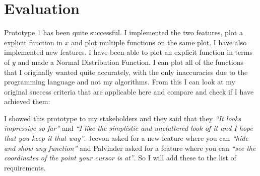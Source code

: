 \documentclass[../../../main.tex]{subfiles}
\begin{document}
\chapter{Evaluation}
Prototype 1 has been quite successful. I implemented the two features, plot a explicit function in $x$ and plot multiple functions on the same plot. I have also implemented new features. I have been able to plot an explicit function in terms of $y$ and made a Normal Distribution Function. I can plot all of the functions that I originally wanted quite accurately, with the only inaccuracies due to the programming language and not my algorithms. From this I can look at my original success criteria that are applicable here and compare and check if I have achieved them:
\begin{table}[H]
\centering
{}
\end{table}
I showed this prototype to my stakeholders and they said that they \textit{``It looks impressive so far''} and \textit{``I like the simplistic and uncluttered look of it and I hope that you keep it that way''}. Jeevon asked for a new feature where you can \textit{``hide and show any function''} and Palvinder asked for a feature where you can \textit{``see the coordinates of the point your cursor is at''}. So I will add these to the list of requirements.
\end{document}
